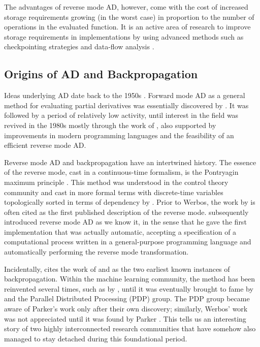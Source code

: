 \documentclass[twoside,11pt]{article}
\begin{document}
The advantages of reverse mode AD, however, come with the cost of increased storage requirements growing (in the worst case) in proportion to the number of operations in the evaluated function. It is an active area of research to improve storage requirements in implementations by using advanced methods such as checkpointing strategies and data-flow analysis \citep{Dauvergne2006,siskind2017divide}.

\subsection{Origins of AD and Backpropagation}

Ideas underlying AD date back to the 1950s \citep{Nolan1953,Beda1959}. Forward mode AD as a general method for evaluating partial derivatives was essentially discovered by \citet{Wengert1964}. It was followed by a period of relatively low activity, until interest in the field was revived in the 1980s mostly through the work of \citet{Griewank1989}, also supported by improvements in modern programming languages and the feasibility of an efficient reverse mode AD.

Reverse mode AD and backpropagation have an intertwined history. The essence of the reverse mode, cast in a continuous-time formalism, is the Pontryagin maximum principle \citep{Rozonoer-Pontryagin-1959a, Boltyanskii-Gamkrelidze-Pontryagin-1960a}. This method was understood in the control theory community \citep{Bryson-1962a, Bryson-Ho-1969a} and cast in more formal terms with discrete-time variables topologically sorted in terms of dependency by \citet{Werbos-1974a}. Prior to Werbos, the work by \citet{linnainmaa1970representation,linnainmaa1976taylor} is often cited as the first published description of the reverse mode. \citet{Speelpenning80} subsequently introduced reverse mode AD as we know it, in the sense that he gave the first implementation that was actually automatic, accepting a specification of a computational process written in a general-purpose programming language and automatically performing the reverse mode transformation.

Incidentally, \citet{Hecht1989} cites the work of \citet{Bryson-Ho-1969a} and \citet{Werbos-1974a} as the two earliest known instances of backpropagation. Within the machine learning community, the method has been reinvented several times, such as by \citet{Parker1985}, until it was eventually brought to fame by \citet{rumelhart1986learning} and the Parallel Distributed Processing (PDP) group. The PDP group became aware of Parker's work only after their own discovery; similarly, Werbos' work was not appreciated until it was found by Parker \citep{Hecht1989}. This tells us an interesting story of two highly interconnected research communities that have somehow also managed to stay detached during this foundational period.
\end{document}

